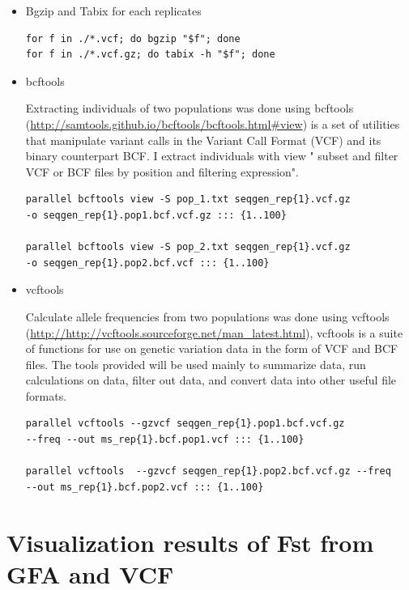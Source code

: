 \begin{itemize}
    \item Bgzip and Tabix for each replicates

\begin{verbatim}
for f in ./*.vcf; do bgzip "$f"; done   
for f in ./*.vcf.gz; do tabix -h "$f"; done
\end{verbatim}



\item bcftools

Extracting individuals of two populations was done using bcftools (\url{http://samtools.github.io/bcftools/bcftools.html#view})  is a set of utilities that manipulate variant calls in the Variant Call Format (VCF) and its binary counterpart BCF.  I extract individuals with view " subset and filter VCF or BCF files by position and filtering expression".


\begin{verbatim}
parallel bcftools view -S pop_1.txt seqgen_rep{1}.vcf.gz
-o seqgen_rep{1}.pop1.bcf.vcf.gz ::: {1..100} 

parallel bcftools view -S pop_2.txt seqgen_rep{1}.vcf.gz 
-o seqgen_rep{1}.pop2.bcf.vcf ::: {1..100}  
\end{verbatim}

\item vcftools

Calculate allele frequencies from two populations was done using vcftools (\url{http://http://vcftools.sourceforge.net/man_latest.html}), vcftools is a suite of functions for use on genetic variation data in the form of VCF and BCF files. The tools provided will be used mainly to summarize data, run calculations on data, filter out data, and convert data into other useful file formats.

\begin{verbatim}
parallel vcftools --gzvcf seqgen_rep{1}.pop1.bcf.vcf.gz 
--freq --out ms_rep{1}.bcf.pop1.vcf ::: {1..100} 

parallel vcftools  --gzvcf seqgen_rep{1}.pop2.bcf.vcf.gz --freq 
--out ms_rep{1}.bcf.pop2.vcf ::: {1..100}  
\end{verbatim}



\end{itemize}


\section{Visualization results of Fst from GFA and VCF}

